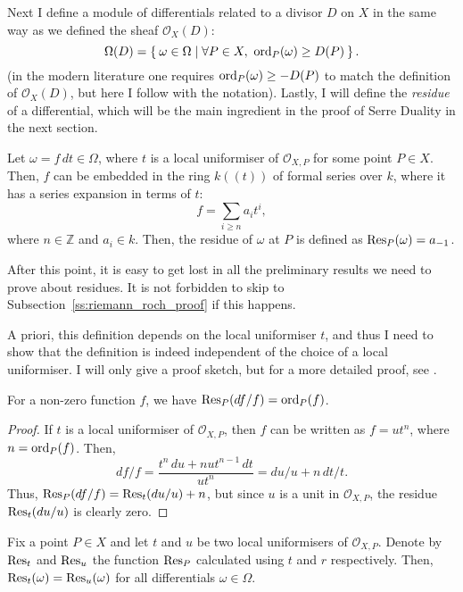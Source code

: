 Next I define a module of differentials related to a divisor $D$
on $X$ in the same way as we defined the sheaf $\mathscr{O}_X(D)$:
\[
  \Omega(D)=\Set{\omega\in\Omega\mid \forall P\in X,\ \operatorname{ord}_{P}(\omega)
  \geq D(P)}.
\]
(in the modern literature one requires $\operatorname{ord}_{P}(\omega)\geq -D(P)$
to match the definition of $\mathscr{O}_X(D)$, but here I follow \cite{serre}
with the notation). Lastly, I will define the \emph{residue} of a
differential, which will be the main ingredient in the proof of Serre
Duality in the next section.
\begin{defin}
  Let $\omega=f\,dt\in\Omega$, where $t$ is a local uniformiser of
  $\mathscr{O}_{X,P}$ for some point $P\in X$. Then, $f$ can be embedded
  in the ring $k((t))$ of formal series over $k$, where it has a series
  expansion in terms of $t$:
  \[
    f=\sum_{i\geq n}a_{i}t^{i},
  \]
  where $n\in\mathbb{Z}$ and $a_{i}\in k$. Then, the residue of $\omega$
  at $P$ is defined as $\operatorname{Res}_{P}(\omega)=a_{-1}$.
\end{defin}
\begin{lnote}
  After this point, it is easy to get lost in all the preliminary
  results we need to prove about residues. It is not forbidden to skip
  to Subsection~\ref{ss:riemann_roch_proof} if this happens.
\end{lnote}
A priori, this definition depends on the local uniformiser $t$, and thus
I need to show that the definition is indeed independent of the choice
of a local uniformiser. I will only give a proof sketch, but for a more
detailed proof, see \cite{serre}.
\begin{lemm}\label{lemm:res_quotient}
  For a non-zero function $f$, we have $\operatorname{Res}_{P}(df/f)=\operatorname{ord}_{P}(f)$.
\end{lemm}
\begin{proof}
  If $t$ is a local uniformiser of $\mathscr{O}_{X,P}$, then $f$ can be
  written as $f=ut^{n}$, where $n=\operatorname{ord}_{P}(f)$. Then,
  \[
    df/f = \frac{t^{n}\,du + nut^{n-1}\,dt}{ut^{n}}=du/u+n\,dt/t.
  \]
  Thus, $\operatorname{Res}_{P}(df/f)=\operatorname{Res}_{t}(du/u)+n$, but since $u$ is a unit in
  $\mathscr{O}_{X,P}$, the residue $\operatorname{Res}_{t}(du/u)$ is clearly zero.
\end{proof}
\begin{prop} %
  Fix a point $P\in X$ and let $t$ and $u$ be two local uniformisers of
  $\mathscr{O}_{X,P}$. Denote by $\operatorname{Res}_{t}$ and $\operatorname{Res}_{u}$ the function
  $\operatorname{Res}_{P}$ calculated using $t$ and $r$ respectively. Then,
  $\operatorname{Res}_{t}(\omega)=\operatorname{Res}_{u}(\omega)$ for all differentials $\omega\in\Omega$.
\end{prop}
